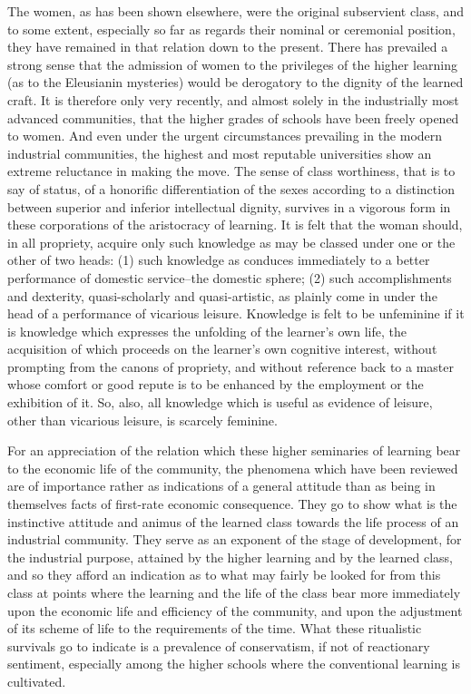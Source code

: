 \documentclass[12pt]{report}
\begin{document}
The women, as has been shown elsewhere, were the original subservient
class, and to some extent, especially so far as regards their nominal
or ceremonial position, they have remained in that relation down to the
present. There has prevailed a strong sense that the admission of
women to the privileges of the higher learning (as to the Eleusianin
mysteries) would be derogatory to the dignity of the learned craft. It
is therefore only very recently, and almost solely in the industrially
most advanced communities, that the higher grades of schools have
been freely opened to women. And even under the urgent circumstances
prevailing in the modern industrial communities, the highest and most
reputable universities show an extreme reluctance in making the move.
The sense of class worthiness, that is to say of status, of a honorific
differentiation of the sexes according to a distinction between superior
and inferior intellectual dignity, survives in a vigorous form in these
corporations of the aristocracy of learning. It is felt that the woman
should, in all propriety, acquire only such knowledge as may be classed
under one or the other of two heads: (1) such knowledge as conduces
immediately to a better performance of domestic service--the domestic
sphere; (2) such accomplishments and dexterity, quasi-scholarly and
quasi-artistic, as plainly come in under the head of a performance of
vicarious leisure. Knowledge is felt to be unfeminine if it is knowledge
which expresses the unfolding of the learner's own life, the acquisition
of which proceeds on the learner's own cognitive interest, without
prompting from the canons of propriety, and without reference back to a
master whose comfort or good repute is to be enhanced by the employment
or the exhibition of it. So, also, all knowledge which is useful as
evidence of leisure, other than vicarious leisure, is scarcely feminine.

For an appreciation of the relation which these higher seminaries of
learning bear to the economic life of the community, the phenomena which
have been reviewed are of importance rather as indications of a general
attitude than as being in themselves facts of first-rate economic
consequence. They go to show what is the instinctive attitude and
animus of the learned class towards the life process of an industrial
community. They serve as an exponent of the stage of development, for
the industrial purpose, attained by the higher learning and by the
learned class, and so they afford an indication as to what may fairly be
looked for from this class at points where the learning and the life of
the class bear more immediately upon the economic life and efficiency
of the community, and upon the adjustment of its scheme of life to
the requirements of the time. What these ritualistic survivals go
to indicate is a prevalence of conservatism, if not of reactionary
sentiment, especially among the higher schools where the conventional
learning is cultivated.
\end{document}
